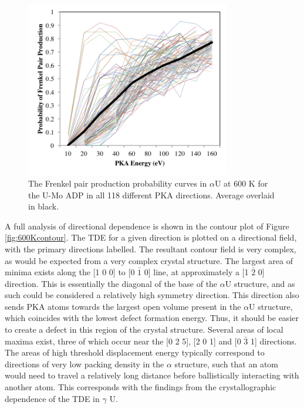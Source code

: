 \documentclass[review]{elsarticle}
\begin{document}
\begin{figure}[h]
 \centering
 \includegraphics[width=0.8\textwidth]{ed_dir_allE_alpha.png} 
 \caption{The Frenkel pair production probability curves in $\alpha$U at 600 K for the U-Mo ADP in all 118 different PKA directions. Average overlaid in black.}
 \label{fig:ed_diralpha}
\end{figure}

\FloatBarrier

A full analysis of directional dependence is shown in the contour plot of Figure \ref{fig:600Kcontour}. The TDE for a given direction is plotted on a directional field, with the primary directions labelled. The resultant contour field is very complex, as would be expected from a very complex crystal structure. The largest area of minima exists along the [1 0 0] to [0 $\bar{1}$ 0] line, at approximately a [1 $\bar{2}$ 0] direction. This is essentially the diagonal of the base of the $\alpha$U structure, and as such could be considered a relatively high symmetry direction. This direction also sends PKA atoms towards the largest open volume present in the $\alpha$U structure, which coincides with the lowest defect formation energy. Thus, it should be easier to create a defect in this region of the crystal structure. Several areas of local maxima exist, three of which occur near the [0 2 5], [2 0 1] and [0 $\bar{3}$ 1] directions. The areas of high threshold displacement energy typically correspond to directions of very low packing density in the $\alpha$ structure, such that an atom would need to travel a relatively long distance before ballistically interacting with another atom. This corresponds with the findings from the crystallographic dependence of the TDE in $\gamma$ U. 
\end{document}

